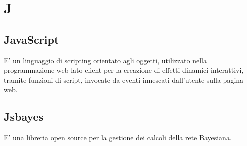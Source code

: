 \section*{J}

\subsection{JavaScript}
E' un linguaggio di scripting orientato agli oggetti, utilizzato nella programmazione web lato client per la creazione di effetti dinamici interattivi, tramite funzioni di script, invocate da eventi innescati dall'utente sulla pagina web.

\subsection{Jsbayes}
E' una libreria open source per la gestione dei calcoli della rete Bayesiana.